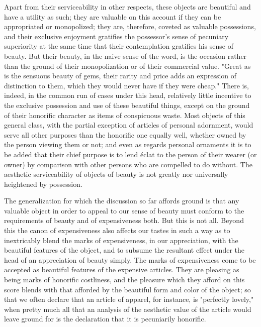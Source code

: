 \documentclass[12pt]{report}
\begin{document}
Apart from their serviceability in other respects, these objects are
beautiful and have a utility as such; they are valuable on this account
if they can be appropriated or monopolized; they are, therefore, coveted
as valuable possessions, and their exclusive enjoyment gratifies the
possessor's sense of pecuniary superiority at the same time that their
contemplation gratifies his sense of beauty. But their beauty, in the
naive sense of the word, is the occasion rather than the ground of their
monopolization or of their commercial value. "Great as is the sensuous
beauty of gems, their rarity and price adds an expression of distinction
to them, which they would never have if they were cheap." There is,
indeed, in the common run of cases under this head, relatively little
incentive to the exclusive possession and use of these beautiful
things, except on the ground of their honorific character as items of
conspicuous waste. Most objects of this general class, with the partial
exception of articles of personal adornment, would serve all other
purposes than the honorific one equally well, whether owned by the
person viewing them or not; and even as regards personal ornaments it is
to be added that their chief purpose is to lend éclat to the person
of their wearer (or owner) by comparison with other persons who are
compelled to do without. The aesthetic serviceability of objects of
beauty is not greatly nor universally heightened by possession.

The generalization for which the discussion so far affords ground is
that any valuable object in order to appeal to our sense of beauty must
conform to the requirements of beauty and of expensiveness both. But
this is not all. Beyond this the canon of expensiveness also affects
our tastes in such a way as to inextricably blend the marks of
expensiveness, in our appreciation, with the beautiful features of
the object, and to subsume the resultant effect under the head of an
appreciation of beauty simply. The marks of expensiveness come to be
accepted as beautiful features of the expensive articles. They are
pleasing as being marks of honorific costliness, and the pleasure which
they afford on this score blends with that afforded by the beautiful
form and color of the object; so that we often declare that an article
of apparel, for instance, is "perfectly lovely," when pretty much all
that an analysis of the aesthetic value of the article would leave
ground for is the declaration that it is pecuniarily honorific.
\end{document}
